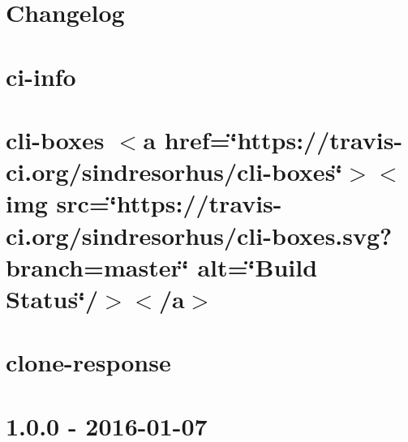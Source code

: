 \let\mypdfximage\pdfximage\def\pdfximage{\immediate\mypdfximage}\documentclass[twoside]{book}
\newcommand{\+}{\discretionary{\mbox{\scriptsize$\hookleftarrow$}}{}{}}
\begin{document}
\chapter{Changelog}
\label{md__c_1__git_hub__p_r_o_y_e_c_t_o-_i_i_i-_g_o_t_rest-api_node_modules_ci-info__c_h_a_n_g_e_l_o_g}

\chapter{ci-\/info}
\label{md__c_1__git_hub__p_r_o_y_e_c_t_o-_i_i_i-_g_o_t_rest-api_node_modules_ci-info__r_e_a_d_m_e}

\chapter{cli-\/boxes $<$a href=\char`\"{}https\+://travis-\/ci.\+org/sindresorhus/cli-\/boxes\char`\"{}$>$$<$img src=\char`\"{}https\+://travis-\/ci.\+org/sindresorhus/cli-\/boxes.\+svg?branch=master\char`\"{} alt=\char`\"{}\+Build Status\char`\"{}/$>$$<$/a$>$}
\label{md__c_1__git_hub__p_r_o_y_e_c_t_o-_i_i_i-_g_o_t_rest-api_node_modules_cli-boxes_readme}

\chapter{clone-\/response}
\label{md__c_1__git_hub__p_r_o_y_e_c_t_o-_i_i_i-_g_o_t_rest-api_node_modules_clone-response__r_e_a_d_m_e}

\chapter{1.0.0 -\/ 2016-\/01-\/07}
\label{md__c_1__git_hub__p_r_o_y_e_c_t_o-_i_i_i-_g_o_t_rest-api_node_modules_color-convert__c_h_a_n_g_e_l_o_g}

\end{document}
